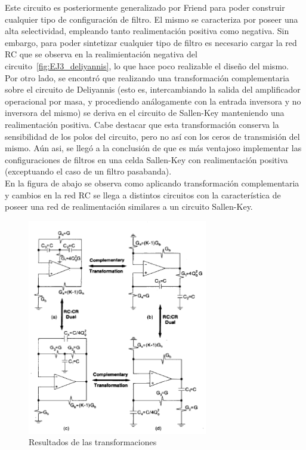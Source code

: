 Este circuito es posteriormente generalizado por Friend para poder construir cualquier tipo de configuraci\'on de filtro. El mismo se caracteriza por poseer una alta selectividad, empleando tanto realimentaci\'on positiva como negativa. Sin embargo, para poder sintetizar cualquier tipo de filtro es necesario cargar la red RC que se observa en la realimientaci\'on negativa del circuito~\ref{fig:EJ3_deliyannis}, lo que hace poco realizable el dise\~no del mismo.\\


Por otro lado, se encontr\'o que realizando una transformaci\'on complementaria sobre el circuito de Deliyannis (esto es, intercambiando la salida del amplificador operacional por masa, y procediendo an\'alogamente con la entrada inversora y no inversora del mismo) se deriva en el circuito de Sallen-Key manteniendo una realimentaci\'on positiva. Cabe destacar que esta transformaci\'on conserva la sensibilidad de los polos del circuito, pero no as\'i con los ceros de transmisi\'on del mismo. A\'un asi, se lleg\'o a la conclusi\'on de que es m\'as ventajoso implementar las configuraciones de filtros en una celda Sallen-Key con realimentaci\'on positiva (exceptuando el caso de un filtro pasabanda).\\


En la figura de abajo se observa como aplicando transformaci\'on complementaria y cambios en la red RC se llega a distintos circuitos con la caracter\'istica de poseer una red de realimentaci\'on similares a un circuito Sallen-Key.

\begin{figure}[H] \label{fig:EJ3_transformation_circuits}
    \centering
    \includegraphics[width=0.7\textwidth]{../EJ3/Resources/transformation_circuits.png}
    \caption{Resultados de las transformaciones}
\end{figure}

